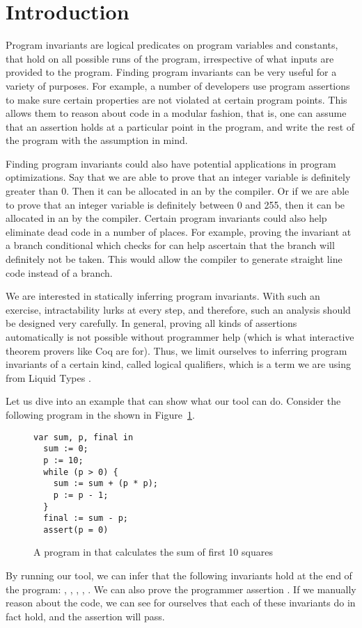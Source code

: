 \documentclass[10pt, conference, compsocconf]{IEEEtran}
\begin{document}
\section{Introduction}

Program invariants are logical predicates on program variables and constants, that hold on all possible runs of the program, irrespective of what inputs are provided to the program.
Finding program invariants can be very useful for a variety of purposes. 
For example, a number of developers use program assertions to make sure certain properties are not violated at certain program points.
This allows them to reason about code in a modular fashion, that is, one can assume that an assertion holds at a particular point in the program, and write the rest of the program with the assumption in mind. 

Finding program invariants could also have potential applications in program optimizations. 
Say that we are able to prove that an integer variable is definitely greater than 0.
Then it can be allocated in an  by the compiler.
Or if we are able to prove that an integer variable is definitely between 0 and 255, then it can be allocated in an  by the compiler.
Certain program invariants could also help eliminate dead code in a number of places.
For example, proving the invariant  at a branch conditional which checks for  can help ascertain that the  branch will definitely not be taken.
This would allow the compiler to generate straight line code instead of a branch.

We are interested in statically inferring program invariants. 
With such an exercise, intractability lurks at every step, and therefore, such an analysis should be designed very carefully.
In general, proving all kinds of assertions automatically is not possible without programmer help (which is what interactive theorem provers like Coq \cite{Coq} are for).
Thus, we limit ourselves to inferring program invariants of a certain kind, called logical qualifiers, which is a term we are using from Liquid Types \cite{Rondon2008}.

Let us dive into an example that can show what our tool can do.
Consider the following program in the \lang shown in Figure~\ref{fig:sum}.
\begin{figure}
\begin{verbatim}
var sum, p, final in
  sum := 0;
  p := 10;
  while (p > 0) {
    sum := sum + (p * p);
    p := p - 1;
  }
  final := sum - p;
  assert(p = 0)   
\end{verbatim}
\caption{A program in \lang that calculates the sum of first 10 squares}
\label{fig:sum}
\end{figure}
By running our tool, we can infer that the following invariants hold at the end of the program: , , , , . We can also prove the programmer assertion .
If we manually reason about the code, we can see for ourselves that each of these invariants do in fact hold, and the assertion will pass.
\end{document}
